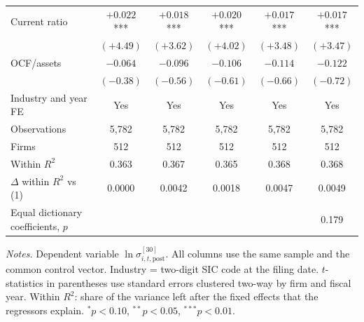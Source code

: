 \begin{table}[htbp]
\begin{tabular}{lccccc}
Current ratio & $+0.022$*** & $+0.018$*** & $+0.020$*** & $+0.017$*** & $+0.017$*** \\
 & $(+4.49)$ & $(+3.62)$ & $(+4.02)$ & $(+3.48)$ & $(+3.47)$ \\[2pt]
OCF/assets & $-0.064$ & $-0.096$ & $-0.106$ & $-0.114$ & $-0.122$ \\
 & $(-0.38)$ & $(-0.56)$ & $(-0.61)$ & $(-0.66)$ & $(-0.72)$ \\[2pt]
\midrule
Industry and year FE & Yes & Yes & Yes & Yes & Yes \\
Observations & 5,782 & 5,782 & 5,782 & 5,782 & 5,782 \\
Firms & 512 & 512 & 512 & 512 & 512 \\
Within $R^2$ & 0.363 & 0.367 & 0.365 & 0.368 & 0.368 \\
$\Delta$ within $R^2$ vs (1) & 0.0000 & 0.0042 & 0.0018 & 0.0047 & 0.0049 \\
Equal dictionary coefficients, $p$ & & & & & 0.179 \\
\bottomrule
\end{tabular}
\par\smallskip
\begin{minipage}{\linewidth}\footnotesize
\emph{Notes.} Dependent variable $\ln\sigma^{[30]}_{i,t,\mathrm{post}}$. All columns use the same sample and the common control vector. Industry = two-digit SIC code at the filing date. $t$-statistics in parentheses use standard errors clustered two-way by firm and fiscal year. Within $R^2$: share of the variance left after the fixed effects that the regressors explain. $^{*}p<0.10$, $^{**}p<0.05$, $^{***}p<0.01$.
\end{minipage}
\end{table}
